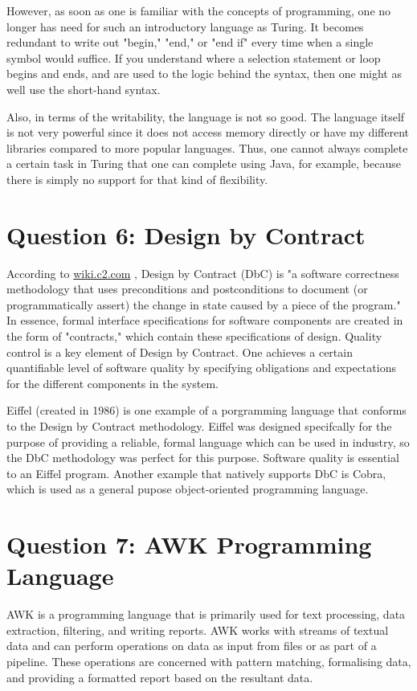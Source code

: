 \documentclass[a4paper]{article}
\begin{document}
	However, as soon as one is familiar with the concepts of programming, one no longer has need for such an introductory language as Turing. It becomes redundant to write out "begin," "end," or "end if" every time when a single symbol would suffice. If you understand where a selection statement or loop begins and ends, and are used to the logic behind the syntax, then one might as well use the short-hand syntax.
	
	Also, in terms of the writability, the language is not so good. The language itself is not very powerful since it does not access memory directly or have my different libraries compared to more popular languages. Thus, one cannot always complete a certain task in Turing that one can complete using Java, for example, because there is simply no support for that kind of flexibility.
	
	
\section{Question 6: Design by Contract}
	According to \url{wiki.c2.com} \cite{c2}, Design by Contract (DbC) is "a software correctness methodology that uses preconditions and postconditions to document (or programmatically assert) the change in state caused by a piece of the program." In essence, formal interface specifications for software components are created in the form of "contracts," which contain these specifications of design. Quality control is a key element of Design by Contract. One achieves a certain quantifiable level of software quality by specifying obligations and expectations for the different components in the system.
	
	Eiffel (created in 1986) is one example of a porgramming language that conforms to the Design by Contract methodology. Eiffel was designed specifcally for the purpose of providing a reliable, formal language which can be used in industry, so the DbC methodology was perfect for this purpose. Software quality is essential to an Eiffel program. Another example that natively supports DbC is Cobra, which is used as a general pupose object-oriented programming language. 
	
\section{Question 7: AWK Programming Language}
	AWK is a programming language that is primarily used for text processing, data extraction, filtering, and writing reports. AWK works with streams of textual data and can perform operations on data as input from files or as part of a pipeline. These operations are concerned with pattern matching, formalising data, and providing a formatted report based on the resultant data.
	
\end{document}
